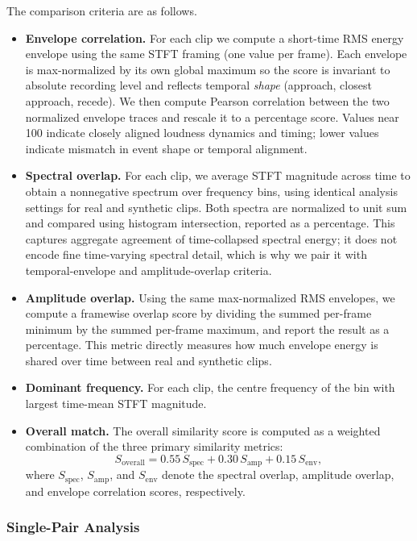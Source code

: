 \documentclass{article}
\begin{document}
The comparison criteria are as follows.
\begin{itemize}
  \item \textbf{Envelope correlation.} For each clip we compute a short-time RMS energy envelope using the same STFT framing (one value per frame). Each envelope is max-normalized by its own global maximum so the score is invariant to absolute recording level and reflects temporal \emph{shape} (approach, closest approach, recede). We then compute Pearson correlation between the two normalized envelope traces and rescale it to a percentage score. Values near 100 indicate closely aligned loudness dynamics and timing; lower values indicate mismatch in event shape or temporal alignment.

  \item \textbf{Spectral overlap.} For each clip, we average STFT magnitude across time to obtain a nonnegative spectrum over frequency bins, using identical analysis settings for real and synthetic clips. Both spectra are normalized to unit sum and compared using histogram intersection, reported as a percentage. This captures aggregate agreement of time-collapsed spectral energy; it does not encode fine time-varying spectral detail, which is why we pair it with temporal-envelope and amplitude-overlap criteria.

  \item \textbf{Amplitude overlap.} Using the same max-normalized RMS envelopes, we compute a framewise overlap score by dividing the summed per-frame minimum by the summed per-frame maximum, and report the result as a percentage. This metric directly measures how much envelope energy is shared over time between real and synthetic clips.

  \item \textbf{Dominant frequency.} For each clip, the centre frequency of the bin with largest time-mean STFT magnitude.

  \item \textbf{Overall match.} The overall similarity score is computed as a weighted combination of the three primary similarity metrics:
  \[
  S_{\mathrm{overall}}
  =
  0.55\,S_{\mathrm{spec}}
  +
  0.30\,S_{\mathrm{amp}}
  +
  0.15\,S_{\mathrm{env}},
  \]
  where $S_{\mathrm{spec}}$, $S_{\mathrm{amp}}$, and $S_{\mathrm{env}}$ denote the spectral overlap, amplitude overlap, and envelope correlation scores, respectively.
\end{itemize}


\subsubsection{Single-Pair Analysis}
\end{document}
